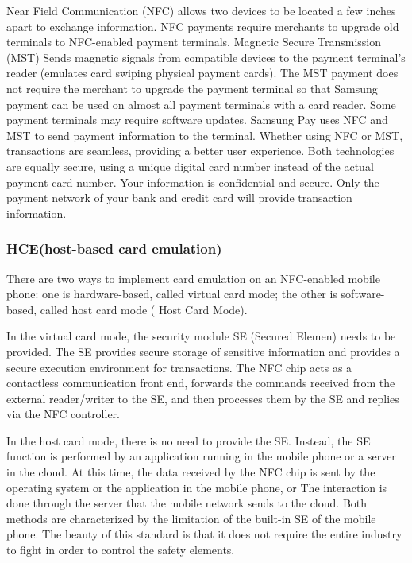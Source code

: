 \documentclass[journal]{IEEEtran}
\begin{document}
Near Field Communication (NFC) allows two devices to be located a few inches apart to exchange information. NFC payments require merchants to upgrade old terminals to NFC-enabled payment terminals. Magnetic Secure Transmission (MST) Sends magnetic signals from compatible devices to the payment terminal's reader (emulates card swiping physical payment cards). The MST payment does not require the merchant to upgrade the payment terminal so that Samsung payment can be used on almost all payment terminals with a card reader. Some payment terminals may require software updates. Samsung Pay uses NFC and MST to send payment information to the terminal. Whether using NFC or MST, transactions are seamless, providing a better user experience. Both technologies are equally secure, using a unique digital card number instead of the actual payment card number. Your information is confidential and secure. Only the payment network of your bank and credit card will provide transaction information.



\subsubsection{HCE(host-based card emulation)}

There are two ways to implement card emulation on an NFC-enabled mobile phone: one is hardware-based, called virtual card mode; the other is software-based, called host card mode ( Host Card Mode).

In the virtual card mode, the security module SE (Secured Elemen) needs to be provided. The SE provides secure storage of sensitive information and provides a secure execution environment for transactions. The NFC chip acts as a contactless communication front end, forwards the commands received from the external reader/writer to the SE, and then processes them by the SE and replies via the NFC controller.

In the host card mode, there is no need to provide the SE. Instead, the SE function is performed by an application running in the mobile phone or a server in the cloud. At this time, the data received by the NFC chip is sent by the operating system or the application in the mobile phone, or The interaction is done through the server that the mobile network sends to the cloud. Both methods are characterized by the limitation of the built-in SE of the mobile phone. The beauty of this standard is that it does not require the entire industry to fight in order to control the safety elements.
\end{document}
